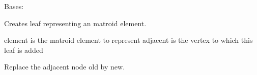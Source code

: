 \documentclass[letterpaper,12pt,english]{sphinxmanual}
\begin{document}
\begin{fulllineitems}
\label{\detokenize{api/modules:cbmpy.fluxmodules.decomposition.Leaf}}
\pysigstartsignatures
\pysiglinewithargsret
{}
{\sphinxparamcomma {}}
{}
\pysigstopsignatures
\sphinxAtStartPar
Bases: {\hyperref[\detokenize{api/modules:cbmpy.fluxmodules.decomposition.AbstractVertex}]{}}

\begin{fulllineitems}
\label{\detokenize{api/modules:cbmpy.fluxmodules.decomposition.Leaf.__init__}}
\pysigstartsignatures
\pysiglinewithargsret
{}
{\sphinxparamcomma {}}
{}
\pysigstopsignatures
\sphinxAtStartPar
Creates leaf representing an matroid element.

\sphinxAtStartPar
element is the matroid element to represent adjacent is the vertex to which this
leaf is added

\end{fulllineitems}


\begin{fulllineitems}
\label{\detokenize{api/modules:cbmpy.fluxmodules.decomposition.Leaf.label}}
\pysigstartsignatures
\pysiglinewithargsret
{}
{}
{}
\pysigstopsignatures
\end{fulllineitems}


\begin{fulllineitems}
\label{\detokenize{api/modules:cbmpy.fluxmodules.decomposition.Leaf.replaceAdjacent}}
\pysigstartsignatures
\pysiglinewithargsret
{}
{\sphinxparamcomma {}}
{}
\pysigstopsignatures
\sphinxAtStartPar
Replace the adjacent node old by new.


\end{fulllineitems}
\end{fulllineitems}
\end{document}

